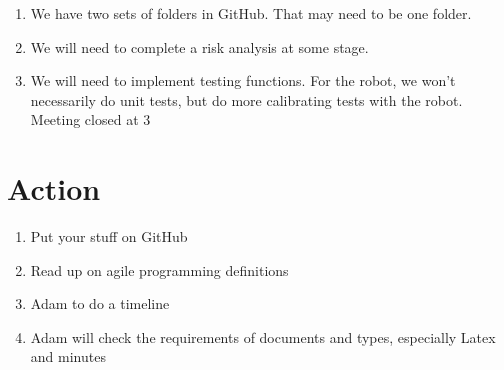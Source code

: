 \documentclass{article}
\begin{document}
\begin{enumerate}
\item We have two sets of folders in GitHub. That may need to be one folder.

\item We will need to complete a risk analysis at some stage.

\item We will need to implement testing functions. For the robot, we won't necessarily do unit
tests, but do more calibrating tests with the robot.\\
Meeting closed at 3

\end{enumerate}

\section{Action}
\begin{enumerate}
\item Put your stuff on GitHub
\item Read up on agile programming definitions
\item Adam to do a timeline
\item Adam will check the requirements of documents and types, especially Latex and minutes

\end{enumerate}
\end{document}
